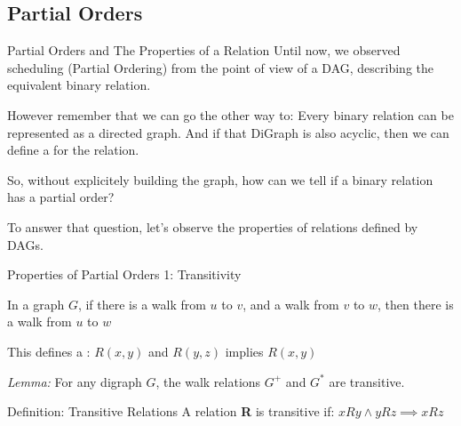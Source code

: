 \subsection{Partial Orders}

\begin{frame}[t]{Partial Orders and The Properties of a Relation}
  Until now, we observed scheduling (Partial Ordering) from the point of view of a DAG, describing the equivalent binary relation.\bigskip 

  However remember that we can go the other way to: Every binary relation can be represented as a directed graph. And if that DiGraph is also acyclic, then we can define a  for the relation.\bigskip 
  
  So, without explicitely building the graph, how can we tell if a binary relation has a partial order?\bigskip 

  To answer that question, let's observe the properties of relations defined by DAGs.
\end{frame}

\begin{frame}[t]{Properties of Partial Orders 1: Transitivity}

  In a graph $G$, if there is a walk from $u$ to $v$, and a walk from $v$ to $w$, then there is a walk from $u$ to $w$
  \begin{center}
  \end{center}\bigskip

  This defines a : $R(x,y)$ and $R(y,z)$ implies $R(x,y)$\bigskip 

  \emph{Lemma:} For any digraph $G$, the walk relations $G^+$ and $G^*$ are transitive.\bigskip 

  \begin{block}{Definition: Transitive Relations}
    A relation {\bf R} is transitive if:\hspace{1cm} $xRy \land yRz \implies xRz$
  \end{block}
\end{frame}

